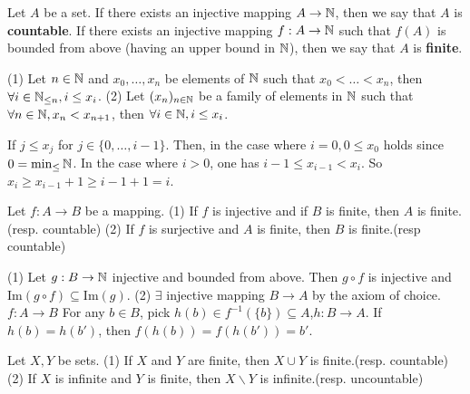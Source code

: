 \documentclass{book}
\numberwithin{equation}{section}
\begin{document}
\begin{definitionenv}
    Let $A$ be a set. If there exists an injective mapping $A\rightarrow \mathbb{N}$, then we say that $A$ is \textbf{countable}.
    If  there exists an injective mapping $f:A\rightarrow \mathbb{N}$ such that $f(A)$ is bounded from above (having an upper bound in $\mathbb{N}$), then we say that $A$ is \textbf{finite}.
\end{definitionenv}
\begin{lemmaenv}\label{4.9.8}
    \quad
    \newline
    (1) Let $n\in \mathbb{N}$ and $x_0,\dots ,x_n$ be elements of $\mathbb{N}$ such that $x_0<\dots<x_n$, then $\forall i\in \mathbb{N}_{\leq n},i\leq x_i$.
    \newline
    (2) Let $(x_n)_{n\in \mathbb{N}}$ be a family of elements in $\mathbb{N}$ such that $\forall n\in \mathbb{N},x_n<x_{n+1}$, then $\forall i\in \mathbb{N},i\le x_i$.
\end{lemmaenv}
\begin{proofenv}
    If $j\le x_j$ for $j\in \{0,\dots,i-1\}$. Then, in the case where $i=0,0\le x_0$ holds since $0=\min_\le \mathbb{N}$. In the case where $i>0$, one has $i-1\le x_{i-1}<x_i$. So $x_i\ge x_{i-1}+1\ge i-1+1=i$.
\end{proofenv}
\begin{propositionenv}
    Let $f:A\rightarrow B$ be a mapping.
    \newline
    (1) If $f$ is injective and if $B$ is finite, then $A$ is finite.(resp. countable)
    \newline
    (2) If $f$ is surjective and $A$ is finite, then $B$ is finite.(resp countable)
\end{propositionenv}
\begin{proofenv}
    \quad
    \newline
    (1) Let $g:B\rightarrow \mathbb{N}$ injective and bounded from above. Then $g\circ f$ is injective and $\mathrm{Im}(g\circ f)\subseteq \mathrm{Im}(g)$.
    \newline
    (2) $\exists$ injective mapping $B\rightarrow A$ by the axiom of choice. $f:A\rightarrow B$ For any $b\in B$, pick $h(b)\in f^{-1}(\{b\})\subseteq A$,$h:B\rightarrow A$. If $h(b)=h(b')$, then $f(h(b))=f(h(b'))=b'$.
\end{proofenv}
\begin{propositionenv}
    Let $X,Y$ be sets.
    \newline
    (1) If $X$ and $Y$ are finite, then $X\cup Y$ is finite.(resp. countable)
    \newline
    (2) If $X$ is infinite and $Y$ is finite, then $X\backslash Y$ is infinite.(resp. uncountable)
\end{propositionenv}
\end{document}

